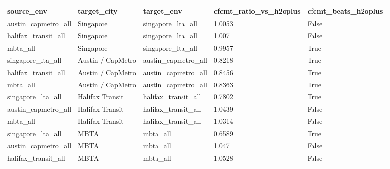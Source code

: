 \begin{tabular}{lllll}
\toprule
source\_env & target\_city & target\_env & cfcmt\_ratio\_vs\_h2oplus & cfcmt\_beats\_h2oplus \\
\midrule
austin\_capmetro\_all & Singapore & singapore\_lta\_all & 1.0053 & False \\
halifax\_transit\_all & Singapore & singapore\_lta\_all & 1.007 & False \\
mbta\_all & Singapore & singapore\_lta\_all & 0.9957 & True \\
singapore\_lta\_all & Austin / CapMetro & austin\_capmetro\_all & 0.8218 & True \\
halifax\_transit\_all & Austin / CapMetro & austin\_capmetro\_all & 0.8456 & True \\
mbta\_all & Austin / CapMetro & austin\_capmetro\_all & 0.8363 & True \\
singapore\_lta\_all & Halifax Transit & halifax\_transit\_all & 0.7802 & True \\
austin\_capmetro\_all & Halifax Transit & halifax\_transit\_all & 1.0439 & False \\
mbta\_all & Halifax Transit & halifax\_transit\_all & 1.0314 & False \\
singapore\_lta\_all & MBTA & mbta\_all & 0.6589 & True \\
austin\_capmetro\_all & MBTA & mbta\_all & 1.047 & False \\
halifax\_transit\_all & MBTA & mbta\_all & 1.0528 & False \\
\bottomrule
\end{tabular}
